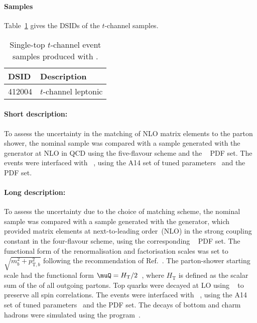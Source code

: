 \subsubsection[MadGraph5\_aMC@NLO+Pythia8]{\MGNLOPY[8]}
\label{subsubsec:tchan_aMCP8}

\paragraph{Samples}

Table~\ref{tab:tchan_aMCP8} gives the DSIDs of the $t$-channel \MGNLOPY[8] samples.

\begin{table}[htbp]
  \caption{Single-top $t$-channel event samples produced with \MGNLOPY[8].}%
  \label{tab:tchan_aMCP8}
  \centering
  \begin{tabular}{l l}
    \toprule
    DSID & Description \\
    \midrule
    412004 & $t$-channel leptonic \\
    \bottomrule
  \end{tabular}
\end{table}

\paragraph{Short description:}

To assess the uncertainty in the matching of NLO matrix elements to the
parton shower, the nominal sample was compared with a sample generated
with the \MGNLO[2.6.2] generator at NLO in QCD using the five-flavour
scheme and the \NNPDF[2.3nlo]~\cite{Ball:2014uwa} PDF set. The events were
interfaced with \PYTHIA[8.230]~\cite{Sjostrand:2014zea}, using the A14
set of tuned parameters~\cite{ATL-PHYS-PUB-2014-021} and the \NNPDF[2.3lo] PDF set.


\paragraph{Long description:}

To assess the uncertainty due to the choice of matching scheme, the nominal sample was compared with a sample generated
with the \MGNLO[2.6.2] generator, which provided matrix elements at next-to-leading order~(NLO) in the strong coupling constant \alphas
in the four-flavour scheme, using the corresponding \NNPDF[3.0nlo]~\cite{Ball:2014uwa} PDF set.
The functional form of the renormalisation and factorisation scales was set to $\sqrt{m_b^2 + p_{\text{T},b}^2}$
following the recommendation of Ref.~\cite{Frederix:2012dh}.
The parton-shower starting scale had the functional form $\muQ = H_\text{T}/2$~\cite{ATL-PHYS-PUB-2017-007}, 
where $H_\text{T}$ is defined as the scalar sum of the \pT of all outgoing partons.
Top quarks were decayed at LO using \MADSPIN~\cite{Frixione:2007zp,Artoisenet:2012st} to preserve all spin correlations.
The events were interfaced with \PYTHIA[8.230]~\cite{Sjostrand:2014zea}, using the A14 set of tuned parameters~\cite{ATL-PHYS-PUB-2014-021} 
and the \NNPDF[2.3lo] PDF set.
The decays of bottom and charm hadrons were simulated using the \EVTGEN[1.6.0] program~\cite{Lange:2001uf}.


